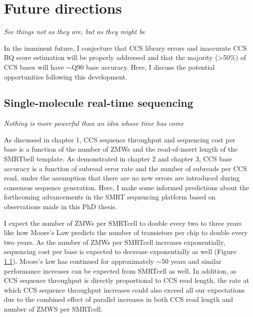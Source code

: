 \section{Future directions}

\textit{See things not as they are, but as they might be}
\begin{flushright}  \end{flushright} 

In the imminent future, I conjecture that CCS library errors and inaccurate CCS BQ score estimation will be properly addressed and that the majority (>50\%) of CCS bases will have $\sim$Q90 base accuracy. Here, I discuss the potential opportunities following this development.

\subsection{Single-molecule real-time sequencing}

\textit{Nothing is more powerful than an idea whose time has come}
\begin{flushright}  \end{flushright} 

As discussed in chapter 1, CCS sequence throughput and sequencing cost per base is a function of the number of ZMWs and the read-of-insert length of the SMRTbell template. As demonstrated in chapter 2 and chapter 3, CCS base accuracy is a function of subread error rate and the number of subreads per CCS read, under the assumption that there are no new errors are introduced during consensus sequence generation. Here, I make some informed predictions about the forthcoming advancements in the SMRT sequencing platform based on observations made in this PhD thesis.

I expect the number of ZMWs per SMRTcell to double every two to three years like how Moore’s Law predicts the number of transistors per chip to double every two years. As the number of ZMWs per SMRTcell increases exponentially, sequencing cost per base is expected to decrease exponentially as well (Figure \ref{}). Moore’s law has continued for approximately $\sim$50 years and similar performance increases can be expected from SMRTcell as well. In addition, as CCS sequence throughput is directly proportional to CCS read length, the rate at which CCS sequence throughput increases could also exceed all our expectations due to the combined effect of parallel increases in both CCS read length and number of ZMWS per SMRTcell. 

